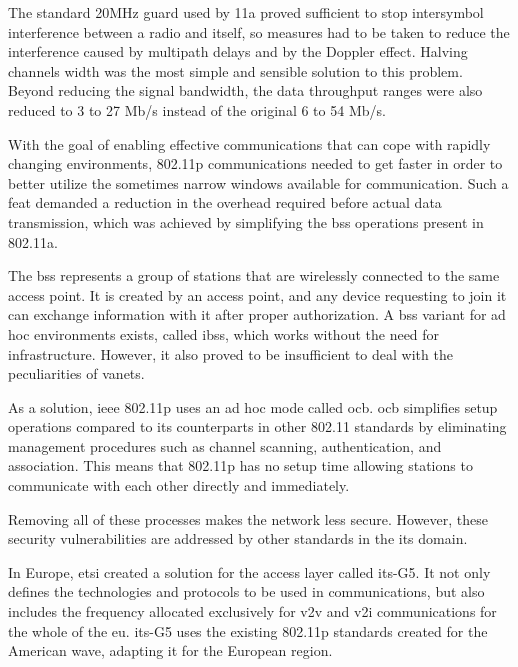 The standard 20MHz guard used by 11a proved sufficient to stop intersymbol interference between a radio and itself, so measures had to be taken to reduce the interference caused by multipath delays and by the Doppler effect. Halving channels width was the most simple and sensible solution to this problem\cite{jiang_ieee_2008}. Beyond reducing the signal bandwidth, the data throughput ranges were also reduced to 3 to 27 Mb/s instead of the original 6 to 54 Mb/s\cite{toor_vehicle_2008}.

With the goal of enabling effective communications that can cope with rapidly changing environments, 802.11p communications needed to get faster in order to better utilize the sometimes narrow windows available for communication. Such a feat demanded a reduction in the overhead required before actual data transmission, which was achieved by simplifying the \gls{bss} operations present in 802.11a\cite{jiang_ieee_2008}.

The \gls{bss} represents a group of stations that are wirelessly connected to the same access point. It is created by an access point, and any device requesting to join it can exchange information with it after proper authorization. A \gls{bss} variant for ad hoc environments exists, called \gls{ibss}, which works without the need for infrastructure. However, it also proved to be insufficient to deal with the peculiarities of \glspl{vanet}.

As a solution, \gls{ieee} 802.11p uses an ad hoc mode called \gls{ocb}. \gls{ocb} simplifies setup operations compared to its counterparts in other 802.11 standards by eliminating management procedures such as channel scanning, authentication, and association. This means that 802.11p has no setup time allowing stations to communicate with each other directly and immediately\cite{festag_cooperative_2014}.

Removing all of these processes makes the network less secure. However, these security vulnerabilities are addressed by other standards in the \gls{its} domain.

In Europe, \gls{etsi} created a solution for the access layer called \gls{its}-G5. It not only defines the technologies and protocols to be used in communications, but also includes the frequency allocated exclusively for \gls{v2v} and \gls{v2i} communications for the whole of the \gls{eu}.\cite{asselin-miller_study_2016} \gls{its}-G5 uses the existing 802.11p standards created for the American \gls{wave}, adapting it for the European region.


